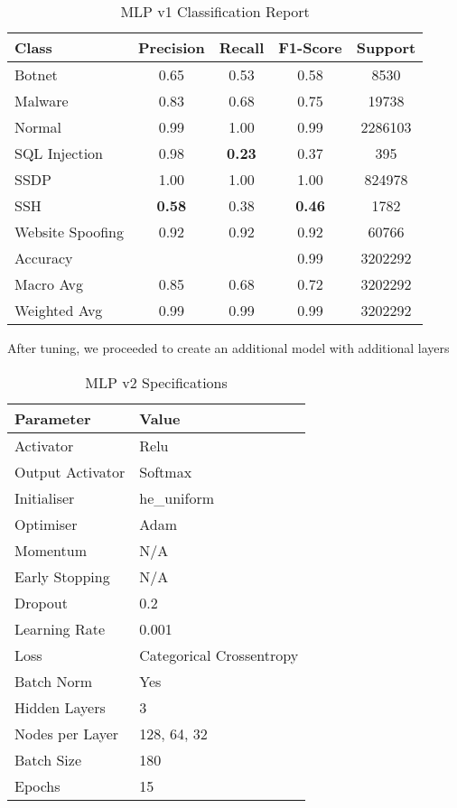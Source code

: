 \begin{table}[htbp]
  \centering
  \caption{MLP v1 Classification Report}
  \label{tab:mlp_v1_class_report}
    \begin{tabular}{lcccc}
    \toprule
    Class & Precision & Recall & F1-Score & Support \\
    \midrule
    Botnet & 0.65 & 0.53 & 0.58 & 8530 \\
    Malware & 0.83 & 0.68 & 0.75 & 19738 \\
    Normal & 0.99 & 1.00 & 0.99 & 2286103 \\
    SQL Injection & 0.98 & {\color{red}\bfseries 0.23} & 0.37 & 395 \\
    SSDP & 1.00 & 1.00 & 1.00 & 824978 \\
    SSH & {\color{red}\bfseries 0.58} & 0.38 & {\color{red}\bfseries 0.46} & 1782 \\
    Website Spoofing & 0.92 & 0.92 & 0.92 & 60766 \\
    \midrule
    Accuracy & & & 0.99 & 3202292 \\
    Macro Avg & 0.85 & 0.68 & 0.72 & 3202292 \\
    Weighted Avg & 0.99 & 0.99 & 0.99 & 3202292 \\
    \bottomrule
    \end{tabular}%
\end{table}%

After tuning, we proceeded to create an additional model with additional layers 

\begin{table}[hp]
\captionsetup{justification=centering} 
\centering
\caption{MLP v2 Specifications}
\begin{tabular}{ll}
\hline
\textbf{Parameter} & \textbf{Value} \\ \hline
Activator & Relu \\
Output Activator & Softmax \\
Initialiser & he\_uniform \\
Optimiser & Adam \\
Momentum & N/A \\
Early Stopping & N/A \\
Dropout & 0.2 \\
Learning Rate & 0.001 \\
Loss & Categorical Crossentropy \\
Batch Norm & Yes \\
Hidden Layers & 3 \\
Nodes per Layer & 128, 64, 32 \\
Batch Size & 180 \\
Epochs & 15 \\ \hline
\end{tabular}
\label{tab:mlp_v2}
\end{table}

